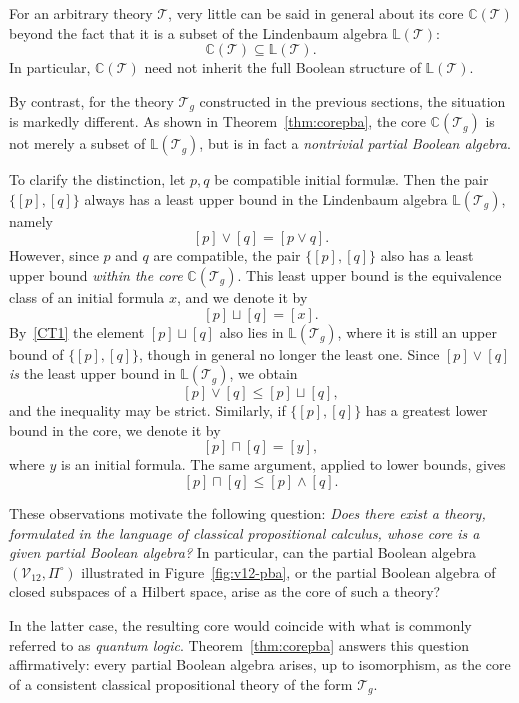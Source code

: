 \documentclass{article}   	%
\theoremstyle{plain}
\theoremstyle{definition}
\theoremstyle{remark}
\begin{document}
\medskip

For an arbitrary theory $\mathcal T$, very little can be said in general
about its core $\mathbb C(\mathcal T)$ beyond the fact that it is a subset of
the Lindenbaum algebra $\mathbb L(\mathcal T)$:
\begin{equation}
\label{CT1}
\mathbb C(\mathcal T)\subseteq \mathbb L(\mathcal T).
\end{equation}
In particular, $\mathbb C(\mathcal T)$ need not inherit the full Boolean
structure of $\mathbb L(\mathcal T)$.

By contrast, for the theory $\mathcal T_g$ constructed in the previous
sections, the situation is markedly different.
As shown in Theorem~\ref{thm:corepba}, the core $\mathbb C(\mathcal T_g)$ is
not merely a subset of $\mathbb L(\mathcal T_g)$, but is in fact a
\emph{nontrivial partial Boolean algebra}.

\medskip

To clarify the distinction, let $p,q$ be compatible initial formul\ae.
Then the pair $\{[p],[q]\}$ always has a least upper bound in the Lindenbaum
algebra $\mathbb L(\mathcal T_g)$, namely
\[
[p]\vee[q]=[p\vee q].
\]
However, since $p$ and $q$ are compatible, the pair $\{[p],[q]\}$ also has
a least upper bound \emph{within the core} $\mathbb C(\mathcal T_g)$.
This least upper bound is the equivalence class of an initial formula $x$,
and we denote it by
\[
[p]\sqcup[q]=[x].
\]
By~\eqref{CT1} the element $[p]\sqcup[q]$ also lies in
$\mathbb L(\mathcal T_g)$, where it is still an upper bound of
$\{[p],[q]\}$, though in general no longer the least one.  Since $[p]\vee[q]$
\emph{is} the least upper bound in $\mathbb L(\mathcal T_g)$, we obtain
\[
[p]\vee[q]\le [p]\sqcup[q],
\]
and the inequality may be strict.
Similarly, if $\{[p],[q]\}$ has a greatest lower bound in the core, we denote
it by
\[
[p]\sqcap[q]=[y],
\]
where $y$ is an initial formula.
The same argument, applied to lower bounds, gives
\[
[p]\sqcap[q]\le [p]\wedge[q].
\]

\medskip

These observations motivate the following question:
\emph{Does there exist a theory, formulated in the language of classical
propositional calculus, whose core is a given partial Boolean algebra?}
In particular, can the partial Boolean algebra
$(\mathcal V_{12},\Pi^\circ)$ illustrated in Figure~\ref{fig:v12-pba}, or the partial
Boolean algebra of closed subspaces of a Hilbert space, arise as the core of
such a theory?

In the latter case, the resulting core would coincide with what is
commonly referred to as \emph{quantum logic}.
Theorem~\ref{thm:corepba} answers this question affirmatively:
every partial Boolean algebra arises, up to isomorphism, as the core of a
consistent classical propositional theory of the form $\mathcal T_g$.
\end{document}
